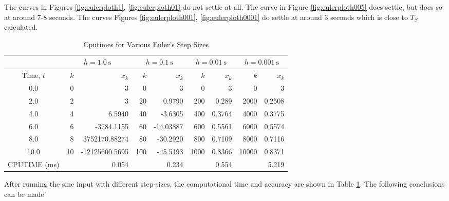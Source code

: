 \documentclass[12pt]{article}
\begin{document}
		The curves in Figures \ref{fig:eulerploth1}, \ref{fig:eulerploth01} do not settle at all. The curve in Figure \ref{fig:eulerploth005} does settle, but does so at around 7-8 seconds. The curves Figures \ref{fig:eulerploth001}, \ref{fig:eulerploth0001} do settle at around 3 seconds which is close to $T_{S}$ calculated. 
		\begin{table}[H]
			\centering
			\caption{Cputimes for Various Euler's Step Sizes}
			\begin{tabular}{|c|r|r|r|r|r|r|r|r|}
				\hline & \multicolumn{2}{|c|}{$h=1.0 \mathrm{~s}$} & \multicolumn{2}{c|}{$h=0.1 \mathrm{~s}$} & \multicolumn{2}{c|}{$h=0.01 \mathrm{~s}$} & \multicolumn{2}{|c|}{$h=0.001 \mathrm{~s}$} \\
				\hline Time, $t$ & $k$ & $x_k$ & $k$ & $x_k$ & $k$ & $x_k$ & $k$ & $x_k$ \\
				\hline 0.0 & 0 & 3 & 0 & 3 & 0 & 3 & 0 & 3 \\
				2.0 & 2 & 3 & 20 & 0.9790 & 200 & 0.289 & 2000 & 0.2508 \\
				4.0 & 4 & 6.5940 & 40 & -3.6305 & 400 & 0.3764 & 4000 & 0.3775 \\
				6.0 & 6 & -3784.1155 & 60 & -14.03887 & 600 & 0.5561 & 6000 & 0.5574 \\
				8.0 & 8 & 3752170.88274 & 80 & -30.2920 & 800 & 0.7109 & 8000 & 0.7116\\
				10.0 & 10 & -12125600.5695 & 100 & -45.5193 & 1000 & 0.8366 & 10000 & 0.8371 \\
				\hline CPUTIME (ms) & & 0.054 & & 0.234 & & 0.554 & & 5.219 \\
				\hline
			\end{tabular}
			\label{tab:euler}
		\end{table}
		After running the sine input with different step-sizes, the computational time and accuracy are shown in Table \ref{tab:euler}. The following conclusions can be made'
\end{document}
